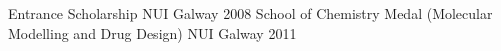 




\begin{cvhonors}

\cvhonor
{Entrance Scholarship} %
{NUI Galway} %
{} %
{2008} %
\cvhonor
{School of Chemistry Medal (Molecular Modelling and Drug Design)} %
{NUI Galway} %
{} %
{2011} %

\end{cvhonors}



